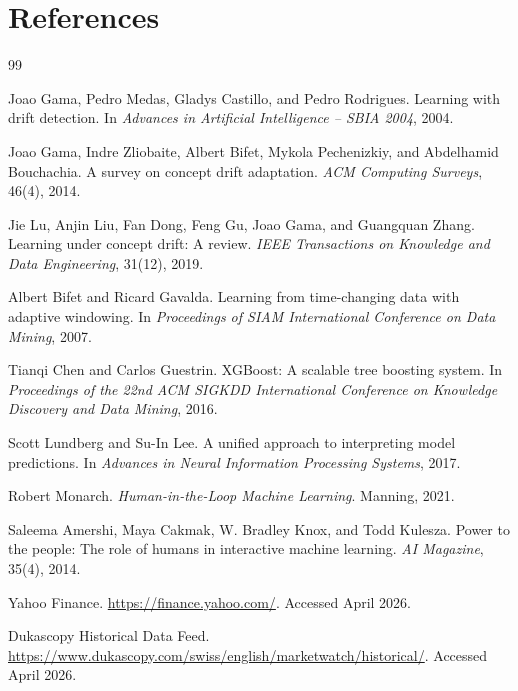 \documentclass[11pt]{article}
\begin{document}
\section{References}
\begin{thebibliography}{99}

Joao Gama, Pedro Medas, Gladys Castillo, and Pedro Rodrigues.
\newblock Learning with drift detection.
\newblock In \emph{Advances in Artificial Intelligence -- SBIA 2004}, 2004.

Joao Gama, Indre Zliobaite, Albert Bifet, Mykola Pechenizkiy, and Abdelhamid Bouchachia.
\newblock A survey on concept drift adaptation.
\newblock \emph{ACM Computing Surveys}, 46(4), 2014.

Jie Lu, Anjin Liu, Fan Dong, Feng Gu, Joao Gama, and Guangquan Zhang.
\newblock Learning under concept drift: A review.
\newblock \emph{IEEE Transactions on Knowledge and Data Engineering}, 31(12), 2019.

Albert Bifet and Ricard Gavalda.
\newblock Learning from time-changing data with adaptive windowing.
\newblock In \emph{Proceedings of SIAM International Conference on Data Mining}, 2007.

Tianqi Chen and Carlos Guestrin.
\newblock XGBoost: A scalable tree boosting system.
\newblock In \emph{Proceedings of the 22nd ACM SIGKDD International Conference on Knowledge Discovery and Data Mining}, 2016.

Scott Lundberg and Su-In Lee.
\newblock A unified approach to interpreting model predictions.
\newblock In \emph{Advances in Neural Information Processing Systems}, 2017.

Robert Monarch.
\newblock \emph{Human-in-the-Loop Machine Learning}.
\newblock Manning, 2021.

Saleema Amershi, Maya Cakmak, W. Bradley Knox, and Todd Kulesza.
\newblock Power to the people: The role of humans in interactive machine learning.
\newblock \emph{AI Magazine}, 35(4), 2014.

Yahoo Finance.
\newblock \url{https://finance.yahoo.com/}.
\newblock Accessed April 2026.

Dukascopy Historical Data Feed.
\url{https://www.dukascopy.com/swiss/english/marketwatch/historical/}.
Accessed April 2026.

\end{thebibliography}
\end{document}
